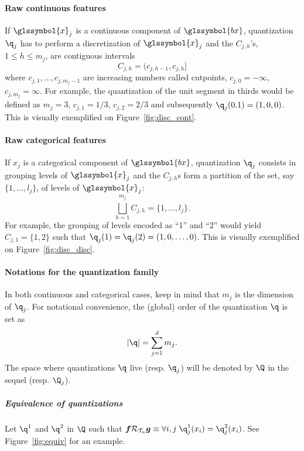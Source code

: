 \paragraph{Raw continuous features} If $\glssymbol{x}_j$ is a continuous component of $\glssymbol{bx}$, quantization $\q_j$ has to perform a discretization of $\glssymbol{x}_j$ and the $C_{j,h}$'s, $1\le h\le m_j$, are contiguous intervals  
\begin{equation}\label{eq:Cjhcont}
C_{j,h}=(c_{j,h-1},c_{j,h}]
\end{equation}
where $c_{j,1},\ldots,c_{j,m_j-1}$ are increasing numbers called cutpoints, $c_{j,0}=-\infty$, $c_{j,m_j}=\infty$. For example, the quantization of the unit segment in thirds would be defined as $m_j=3$, $c_{j,1} = 1/3$, $c_{j,2} = 2/3$ and subsequently $\q_j(0.1) = (1,0,0)$. This is visually exemplified on Figure~\ref{fig:disc_cont}.
\paragraph{Raw categorical features} If $x_j$ is a categorical component of $\glssymbol{bx}$, quantization $\q_j$ consists in grouping levels of $\glssymbol{x}_j$ and the $C_{j,h}$s form a partition of the set, say $\{1,\ldots,l_j\}$, of levels of $\glssymbol{x}_j$: 
\begin{equation*}
\bigsqcup_{h=1}^{m_j}C_{j,h}=\{1,\ldots,l_j\}.
\end{equation*}
For example, the grouping of levels encoded as ``1'' and ``2'' would yield $C_{j,1} = \{1,2\}$ such that $\q_j(1) = \q_j(2) = (1,0,\ldots,0)$. This is visually exemplified on Figure~\ref{fig:disc_disc}.

\paragraph{Notations for the quantization family}

In both continuous and categorical cases, keep in mind that $m_j$ is the dimension of $\q_j$. For notational convenience, the (global) order of the quantization $\q$ is set as 
\[|\q|=\sum_{j=1}^d m_j.\]
The space where quantizations $\q$ live (resp. $\q_j$) will be denoted by $\Q$ in the sequel (resp. $\Q_j$).

\subparagraph{Equivalence of quantizations} \label{par:equiv}

Let $\q^1$ and $\q^2$ in $\Q$ such that $\boldsymbol{f} \mathcal{R}_{\mathcal{T}_n} \boldsymbol{g} \equiv \forall i,j \; \q^1_j(x_i) = \q^2_j(x_i)$. See Figure~\ref{fig:equiv} for an example.

